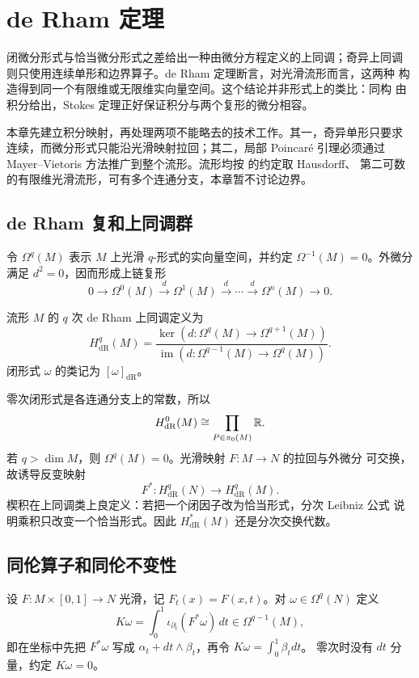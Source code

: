 \chapter{de Rham 定理}
\label{chap:de-rham-theorem}

闭微分形式与恰当微分形式之差给出一种由微分方程定义的上同调；奇异上同调
则只使用连续单形和边界算子。de Rham 定理断言，对光滑流形而言，这两种
构造得到同一个有限维或无限维实向量空间。这个结论并非形式上的类比：同构
由积分给出，Stokes 定理正好保证积分与两个复形的微分相容。

本章先建立积分映射，再处理两项不能略去的技术工作。其一，奇异单形只要求
连续，而微分形式只能沿光滑映射拉回；其二，局部 Poincaré 引理必须通过
Mayer--Vietoris 方法推广到整个流形。流形均按
的约定取 Hausdorff、
第二可数的有限维光滑流形，可有多个连通分支，本章暂不讨论边界。

\section{de Rham 复和上同调群}

令 $\Omega^q(M)$ 表示 $M$ 上光滑 $q$-形式的实向量空间，并约定
$\Omega^{-1}(M)=0$。外微分满足 $d^2=0$，因而形成上链复形
\[
 0\longrightarrow\Omega^0(M)\xrightarrow{d}\Omega^1(M)
 \xrightarrow{d}\cdots\xrightarrow{d}\Omega^n(M)\longrightarrow0.
\]

\begin{definition}
流形 $M$ 的 $q$ 次 de Rham 上同调定义为
\[
 H_{\mathrm{dR}}^q(M)
 =\frac{\ker(d:\Omega^q(M)\to\Omega^{q+1}(M))}
 {\operatorname{im}(d:\Omega^{q-1}(M)\to\Omega^q(M))}.
\]
闭形式 $\omega$ 的类记为 $[\omega]_{\mathrm{dR}}$。
\end{definition}

零次闭形式是各连通分支上的常数，所以
\[
 H_{\mathrm{dR}}^0(M)\cong
 \prod_{P\in\pi_0(M)}\mathbb{R}.
\]
若 $q>\dim M$，则 $\Omega^q(M)=0$。光滑映射 $F:M\to N$ 的拉回与外微分
可交换，故诱导反变映射
\[
 F^*:H_{\mathrm{dR}}^q(N)\to H_{\mathrm{dR}}^q(M).
\]
楔积在上同调类上良定义：若把一个闭因子改为恰当形式，分次 Leibniz 公式
说明乘积只改变一个恰当形式。因此 $H_{\mathrm{dR}}^*(M)$ 还是分次交换代数。

\section{同伦算子和同伦不变性}

设 $F:M\times[0,1]\to N$ 光滑，记 $F_t(x)=F(x,t)$。对
$\omega\in\Omega^q(N)$ 定义
\[
 K\omega=\int_0^1\iota_{\partial_t}(F^*\omega)\,dt
 \in\Omega^{q-1}(M),
\]
即在坐标中先把 $F^*\omega$ 写成
$\alpha_t+dt\wedge\beta_t$，再令 $K\omega=\int_0^1\beta_tdt$。
零次时没有 $dt$ 分量，约定 $K\omega=0$。


